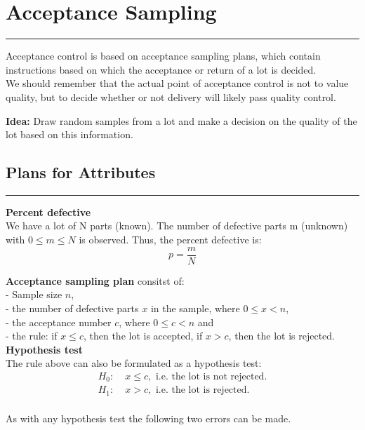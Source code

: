 \section{Acceptance Sampling}
\noindent\rule[\linienAbstand]{\linewidth}{\linienDickeDick}
Acceptance control is based on acceptance sampling plans, which contain instructions based on which the acceptance or return of a lot is decided.\\
We should remember that the actual point of acceptance control is not to value quality, but to decide whether or not delivery will likely pass quality control.

\textbf{Idea:} Draw random samples from a lot and make a decision on the quality of the lot based on this information.

\subsection{Plans for Attributes}
\noindent\rule[\linienAbstand]{\linewidth}{\linienDicke}
\textbf{Percent defective}\\
We have a lot of N parts (known). The number of defective parts m (unknown) with $0 \leq m \leq N$ is observed. Thus, the percent defective is:
\begin{equation}
  p = \frac{m}{N}
\end{equation}

\textbf{Acceptance sampling plan} consitst of:\\
 - Sample size $n$,\\
 - the number of defective parts $x$ in the sample, where $0 \leq x < n$,\\
 - the acceptance number $c$, where $0 \leq c < n$ and\\
 - the rule: if $x \leq c$, then the lot is accepted, if $x > c$, then the lot is rejected.\\

\textbf{Hypothesis test}\\
The rule above can also be formulated as a hypothesis test:
\begin{equation}
  \begin{split}
    H_0:\; & x \leq c,\text{ i.e. the lot is not rejected.}\\
    H_1:\; & x > c,\text{ i.e. the lot is rejected.}\\
  \end{split}
\end{equation}

As with any hypothesis test the following two errors can be made.\\

